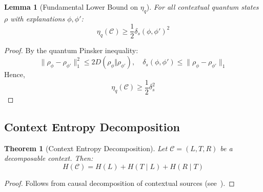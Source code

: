 \documentclass[preprint,12pt]{elsarticle}
\newtheorem{theorem}{Theorem}[section]
\newtheorem{lemma}{Lemma}[section]
\begin{document}
            \begin{lemma}[Fundamental Lower Bound on $\eta_q$]\label{lem:etaq_fundamental} 
                For all contextual quantum states $\rho$ with explanations $\phi, \phi'$:
                \begin{equation}\label{eq:etaq_fundamental} 
                    \eta_q(\mathcal{C}) \geq \frac{1}{2} \delta_s(\phi, \phi')^2
                \end{equation}
            \end{lemma}

            \begin{proof}\label{pr:etaq_fundamental} 
                By the quantum Pinsker inequality:
                \begin{equation}\label{eq:pr_etaq_fundamental1} 
                    \|\rho_\phi - \rho_{\phi'}\|_1^2 \leq 2 D(\rho_\phi \Vert \rho_{\phi'}), \quad \delta_s(\phi, \phi') \leq \|\rho_\phi - \rho_{\phi'}\|_1
                \end{equation}
                Hence,
                \begin{equation}\label{eq:pr_etaq_fundamental2} 
                    \eta_q(\mathcal{C}) \geq \frac{1}{2} \delta_s^2
                \end{equation}
            \end{proof}

            \subsection{Context Entropy Decomposition}

            \begin{theorem}[Context Entropy Decomposition] \label{thm:context_entropy_decomp} 
                Let $\mathcal{C} = (L, T, R)$ be a decomposable context. Then:
                \begin{equation}\label{eq:context_entropy_decomp} 
                    H(\mathcal{C}) = H(L) + H(T \mid L) + H(R \mid T)
                \end{equation}
            \end{theorem}

            \begin{proof}\label{pr:context_entropy_decomp} 
                Follows from causal decomposition of contextual sources (see~\cite{Alam2023}).
            \end{proof}
\end{document}
